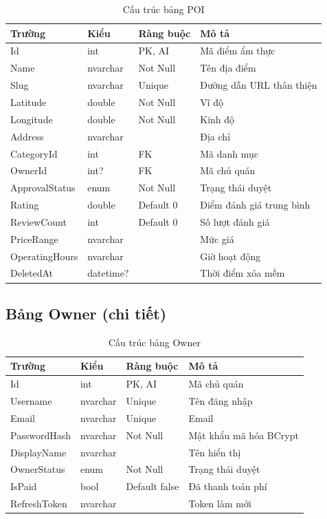 \documentclass[a4paper,13pt]{report}
\begin{document}
\begin{table}[H]
\centering
\caption{Cấu trúc bảng POI}
\begin{tabularx}{\textwidth}{|l|l|l|X|}
\hline
\textbf{Trường} & \textbf{Kiểu} & \textbf{Ràng buộc} & \textbf{Mô tả} \\
\hline
Id & int & PK, AI & Mã điểm ẩm thực \\
\hline
Name & nvarchar & Not Null & Tên địa điểm \\
\hline
Slug & nvarchar & Unique & Đường dẫn URL thân thiện \\
\hline
Latitude & double & Not Null & Vĩ độ \\
\hline
Longitude & double & Not Null & Kinh độ \\
\hline
Address & nvarchar & & Địa chỉ \\
\hline
CategoryId & int & FK & Mã danh mục \\
\hline
OwnerId & int? & FK & Mã chủ quán \\
\hline
ApprovalStatus & enum & Not Null & Trạng thái duyệt \\
\hline
Rating & double & Default 0 & Điểm đánh giá trung bình \\
\hline
ReviewCount & int & Default 0 & Số lượt đánh giá \\
\hline
PriceRange & nvarchar & & Mức giá \\
\hline
OperatingHours & nvarchar & & Giờ hoạt động \\
\hline
DeletedAt & datetime? & & Thời điểm xóa mềm \\
\hline
\end{tabularx}
\end{table}

\subsection{Bảng Owner (chi tiết)}

\begin{table}[H]
\centering
\caption{Cấu trúc bảng Owner}
\begin{tabularx}{\textwidth}{|l|l|l|X|}
\hline
\textbf{Trường} & \textbf{Kiểu} & \textbf{Ràng buộc} & \textbf{Mô tả} \\
\hline
Id & int & PK, AI & Mã chủ quán \\
\hline
Username & nvarchar & Unique & Tên đăng nhập \\
\hline
Email & nvarchar & Unique & Email \\
\hline
PasswordHash & nvarchar & Not Null & Mật khẩu mã hóa BCrypt \\
\hline
DisplayName & nvarchar & & Tên hiển thị \\
\hline
OwnerStatus & enum & Not Null & Trạng thái duyệt \\
\hline
IsPaid & bool & Default false & Đã thanh toán phí \\
\hline
RefreshToken & nvarchar & & Token làm mới \\
\hline
\end{tabularx}
\end{table}
\end{document}
